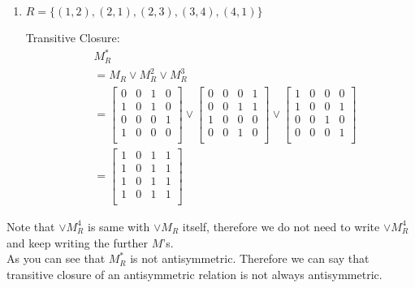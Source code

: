 \documentclass[12pt]{article}
\begin{document}
\begin{enumerate}
    \item \( R = \{(1, 2),(2, 1),(2, 3),(3, 4),(4, 1)\} \)

    Transitive Closure:
    \begin{align*}
    &M_R^* \\
    &= M_R \lor M_R^2  \lor M_R^3 \\
    &= \begin{bmatrix}
    0 & 0 & 1 & 0 \\
    1 & 0 & 1 & 0 \\
    0 & 0 & 0 & 1 \\
    1 & 0 & 0 & 0 \\
    \end{bmatrix} \lor \begin{bmatrix}
    0 & 0 & 0 & 1\\
    0 & 0 & 1 & 1 \\
    1 & 0 & 0 & 0 \\
    0 & 0 & 1 & 0 \\
    \end{bmatrix} \lor \begin{bmatrix}
    1 & 0 & 0 & 0 \\
    1 & 0 & 0 & 1 \\
    0 & 0 & 1 & 0 \\
    0 & 0 & 0 & 1 \\
    \end{bmatrix} \\
    &= \begin{bmatrix}
    1 & 0 & 1 & 1 \\
    1 & 0 & 1 & 1 \\
    1 & 0 & 1 & 1 \\
    1 & 0 & 1 & 1 \\
    \end{bmatrix}
    \end{align*}
\end{enumerate}

Note that \(\lor M_R^4\) is same with \(\lor M_R\) itself, therefore we do not need to write \(\lor M_R^4\) and keep writing the further \(M\)'s.\\

As you can see that \(M_R^*\) is not antisymmetric. Therefore we can say that transitive closure of an antisymmetric relation is not always antisymmetric.\\
\end{document}
